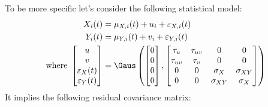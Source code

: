 \documentclass[12pt]{article}
\begin{document}
To be more specific let's consider the following statistical model:
\begin{align*}
X_i(t) &= \mu_{X,i}(t) + u_i + \varepsilon_{X,i}(t) \\
Y_i(t) &= \mu_{Y,i}(t) + v_i + \varepsilon_{Y,i}(t) \\
\text{where } \begin{bmatrix}u \\ v \\ \varepsilon_X(t) \\ \varepsilon_Y(t) \end{bmatrix}
&= \Gaus\left(\begin{bmatrix}0 \\ 0 \\ 0 \\ 0 \end{bmatrix},
\begin{bmatrix}
\tau_u & \tau_{uv} & 0 & 0 \\ \tau_{uv} & \tau_v & 0 & 0 \\ 
 0 & 0 & \sigma_X & \sigma_{XY} \\ 0 & 0 & \sigma_{XY} & \sigma_X \\ 
\end{bmatrix} \right)
\end{align*}
It implies the following residual covariance matrix:
\end{document}
